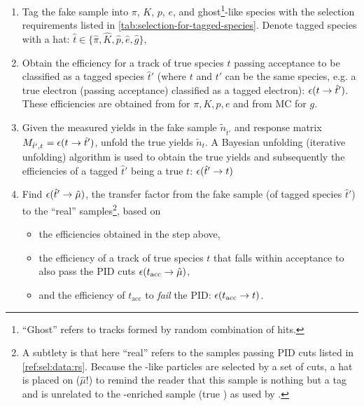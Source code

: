 \begin{enumerate}
    \item Tag the fake \muon sample into $\pi$, $K$, $p$,
        $e$, and ghost\footnote{
            ``Ghost'' refers to tracks formed by random combination of hits.
        }-like species with the selection requirements listed in
        \cref{tab:selection-for-tagged-species}.
        Denote tagged species with a hat:
        $\hat{t} \in \{\hat{\pi}, \hat{K}, \hat{p}, \hat{e}, \hat{g}\}$,

    \item Obtain the efficiency for a track of true species $t$ passing \muon
        acceptance to be classified as a tagged species $\hat{t}'$
        (where $t$ and $t'$ can be the same species, e.g. a true electron
        (passing \muon acceptance) classified as a tagged electron):
        $\misEff[t]{\hat{t}'}$.
        These efficiencies are obtained from \pidcalib for $\pi, K, p, e$ and
        from MC for $g$.

    \item Given the measured yields in the fake \muon sample $\tilde{n}_{\hat{t}'}
        $ and response matrix
        $M_{\hat{t}', t^{\phantom{}}} = \misEff[t^{\phantom{}}]{\hat{t}'}$,
        unfold the true yields $\tilde{n}_{t}$.
        A Bayesian unfolding (iterative unfolding) algorithm is used to obtain
        the true yields  %
        and subsequently the efficiencies of a tagged
        $\hat{t}'$ being a true $t$: $\misEff[\hat{t}']{t}$

      \item Find $\misEff[\hat{t}']{\hat{\mu}}$,
        the transfer factor from the fake \muon sample
        (of tagged species $\hat{t}'$) to the ``real'' \muon
        samples\footnote{
            A subtlety is that here ``real'' \muon refers to the samples passing
            \muon PID cuts listed in \cref{ref:sel:data:rs}.
            Because the \muon-like particles are selected by a set of cuts,
            a hat is placed on \muon ($\hat{\mu}$!)
            to remind the reader that this sample is nothing but a \muon tag
            and is unrelated to the \muon-enriched sample (true \muon) as used
            by \pidcalib.
        },
        based on
        \begin{itemize}
            \item the efficiencies obtained in the step above,
            \item the efficiency of a track of true species $t$ that falls
                within \muon acceptance to also pass the \muon PID cuts
                $\misEff[t_\text{acc}]{\hat{\mu}}$,
            \item and the efficiency of $t_\text{acc}$ to \emph{fail} the \muon
                PID:
                $\misEff[t_\text{acc}]{t}$.
        \end{itemize}


\end{enumerate}
